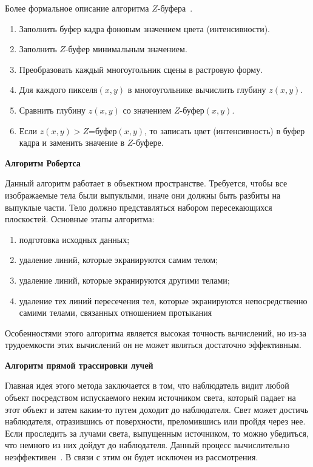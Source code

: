 Более формальное описание алгоритма $Z$-буфера~\cite{rodgers}.
\begin{enumerate}
	\item Заполнить буфер кадра фоновым значением цвета (интенсивности).
	\item Заполнить $Z$-буфер минимальным значением.
	\item Преобразовать каждый многоугольник сцены в растровую форму.
	\item Для каждого пикселя$(x,y)$ в многоугольнике вычислить глубину $z(x,y)$.
	\item Сравнить глубину $z(x,y)$ со значением $Z$-буфер$(x,y)$.
	\item Если $z(x,y) > Z$=буфер$(x,y)$, то записать цвет (интенсивность) в буфер кадра и заменить значение в $Z$-буфере.
\end{enumerate}

\textbf{Алгоритм Робертса}

Данный алгоритм работает в объектном пространстве. Требуется, чтобы все изображаемые тела были выпуклыми, иначе они должны быть разбиты на выпуклые части. 
Тело должно представляться набором пересекающихся плоскостей. 
Основные этапы алгоритма:
\begin{enumerate}
	\item подготовка исходных данных;
	\item удаление линий, которые экранируются самим телом;
	\item удаление линий, которые экранируются другими телами;
	\item удаление тех линий пересечения тел, которые экранируются непосредственно самими телами, связанных отношением протыкания
\end{enumerate}

Особенностями этого алгоритма является высокая точность вычислений, но из-за трудоемкости этих вычислений он не может являться достаточно эффективным.

\textbf{Алгоритм прямой трассировки лучей}

Главная идея этого метода заключается в том, что наблюдатель видит любой объект посредством испускаемого неким источником света, который падает на этот объект и затем каким-то путем доходит до наблюдателя. Свет может достичь наблюдателя, отразившись от поверхности, преломившись или пройдя через нее. Если проследить за лучами света, выпущенным источником, то можно убедиться, что немного из них дойдут до наблюдателя. Данный процесс вычислительно неэффективен~\cite{rodgers}. В связи с этим он будет исключен из рассмотрения.

